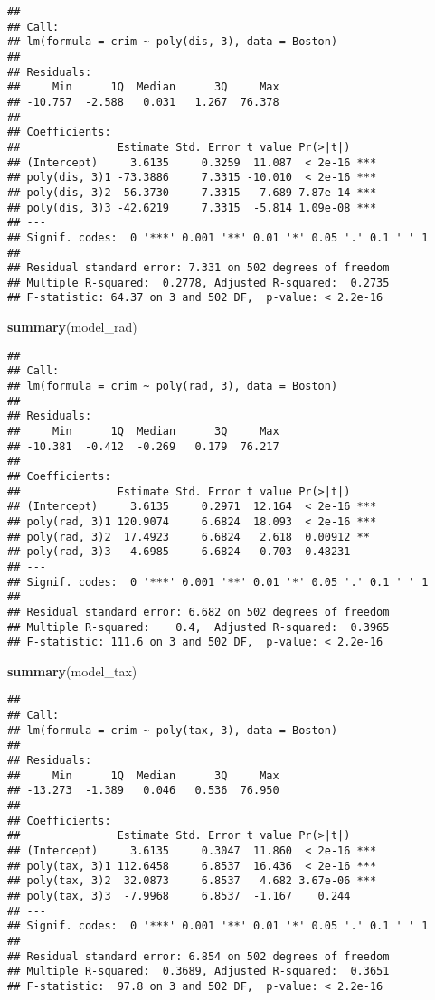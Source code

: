 \documentclass[
]{article}
\newenvironment{Shaded}{\begin{snugshade}}{\end{snugshade}}
\newcommand{\FunctionTok}[1]{\textcolor[rgb]{0.13,0.29,0.53}{\textbf{#1}}}
\newcommand{\NormalTok}[1]{#1}
\begin{document}
\begin{verbatim}
## 
## Call:
## lm(formula = crim ~ poly(dis, 3), data = Boston)
## 
## Residuals:
##     Min      1Q  Median      3Q     Max 
## -10.757  -2.588   0.031   1.267  76.378 
## 
## Coefficients:
##               Estimate Std. Error t value Pr(>|t|)    
## (Intercept)     3.6135     0.3259  11.087  < 2e-16 ***
## poly(dis, 3)1 -73.3886     7.3315 -10.010  < 2e-16 ***
## poly(dis, 3)2  56.3730     7.3315   7.689 7.87e-14 ***
## poly(dis, 3)3 -42.6219     7.3315  -5.814 1.09e-08 ***
## ---
## Signif. codes:  0 '***' 0.001 '**' 0.01 '*' 0.05 '.' 0.1 ' ' 1
## 
## Residual standard error: 7.331 on 502 degrees of freedom
## Multiple R-squared:  0.2778, Adjusted R-squared:  0.2735 
## F-statistic: 64.37 on 3 and 502 DF,  p-value: < 2.2e-16
\end{verbatim}

\begin{Shaded}
\begin{Highlighting}[]
\FunctionTok{summary}\NormalTok{(model\_rad)}
\end{Highlighting}
\end{Shaded}

\begin{verbatim}
## 
## Call:
## lm(formula = crim ~ poly(rad, 3), data = Boston)
## 
## Residuals:
##     Min      1Q  Median      3Q     Max 
## -10.381  -0.412  -0.269   0.179  76.217 
## 
## Coefficients:
##               Estimate Std. Error t value Pr(>|t|)    
## (Intercept)     3.6135     0.2971  12.164  < 2e-16 ***
## poly(rad, 3)1 120.9074     6.6824  18.093  < 2e-16 ***
## poly(rad, 3)2  17.4923     6.6824   2.618  0.00912 ** 
## poly(rad, 3)3   4.6985     6.6824   0.703  0.48231    
## ---
## Signif. codes:  0 '***' 0.001 '**' 0.01 '*' 0.05 '.' 0.1 ' ' 1
## 
## Residual standard error: 6.682 on 502 degrees of freedom
## Multiple R-squared:    0.4,  Adjusted R-squared:  0.3965 
## F-statistic: 111.6 on 3 and 502 DF,  p-value: < 2.2e-16
\end{verbatim}

\begin{Shaded}
\begin{Highlighting}[]
\FunctionTok{summary}\NormalTok{(model\_tax)}
\end{Highlighting}
\end{Shaded}

\begin{verbatim}
## 
## Call:
## lm(formula = crim ~ poly(tax, 3), data = Boston)
## 
## Residuals:
##     Min      1Q  Median      3Q     Max 
## -13.273  -1.389   0.046   0.536  76.950 
## 
## Coefficients:
##               Estimate Std. Error t value Pr(>|t|)    
## (Intercept)     3.6135     0.3047  11.860  < 2e-16 ***
## poly(tax, 3)1 112.6458     6.8537  16.436  < 2e-16 ***
## poly(tax, 3)2  32.0873     6.8537   4.682 3.67e-06 ***
## poly(tax, 3)3  -7.9968     6.8537  -1.167    0.244    
## ---
## Signif. codes:  0 '***' 0.001 '**' 0.01 '*' 0.05 '.' 0.1 ' ' 1
## 
## Residual standard error: 6.854 on 502 degrees of freedom
## Multiple R-squared:  0.3689, Adjusted R-squared:  0.3651 
## F-statistic:  97.8 on 3 and 502 DF,  p-value: < 2.2e-16
\end{verbatim}
\end{document}
